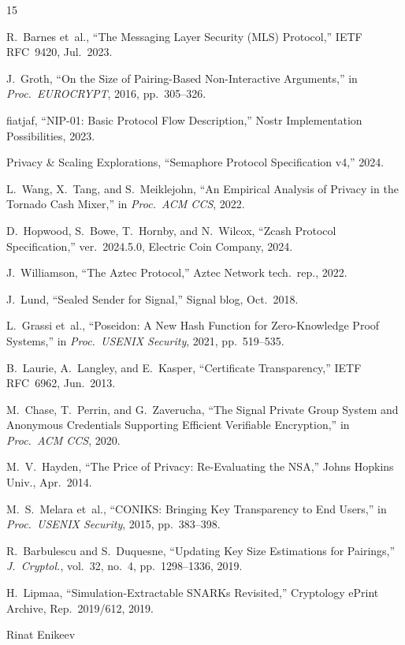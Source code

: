 \documentclass[journal]{IEEEtran}
\begin{document}
\begin{thebibliography}{15}

R.~Barnes et~al., ``The Messaging Layer Security (MLS) Protocol,'' IETF RFC~9420, Jul.\ 2023.

J.~Groth, ``On the Size of Pairing-Based Non-Interactive Arguments,'' in \emph{Proc.\ EUROCRYPT}, 2016, pp.~305--326.

fiatjaf, ``NIP-01: Basic Protocol Flow Description,'' Nostr Implementation Possibilities, 2023.

Privacy \& Scaling Explorations, ``Semaphore Protocol Specification v4,'' 2024.

L.~Wang, X.~Tang, and S.~Meiklejohn, ``An Empirical Analysis of Privacy in the Tornado Cash Mixer,'' in \emph{Proc.\ ACM CCS}, 2022.

D.~Hopwood, S.~Bowe, T.~Hornby, and N.~Wilcox, ``Zcash Protocol Specification,'' ver.\ 2024.5.0, Electric Coin Company, 2024.

J.~Williamson, ``The Aztec Protocol,'' Aztec Network tech.\ rep., 2022.

J.~Lund, ``Sealed Sender for Signal,'' Signal blog, Oct.\ 2018.

L.~Grassi et~al., ``Poseidon: A New Hash Function for Zero-Knowledge Proof Systems,'' in \emph{Proc.\ USENIX Security}, 2021, pp.~519--535.

B.~Laurie, A.~Langley, and E.~Kasper, ``Certificate Transparency,'' IETF RFC~6962, Jun.\ 2013.

M.~Chase, T.~Perrin, and G.~Zaverucha, ``The Signal Private Group System and Anonymous Credentials Supporting Efficient Verifiable Encryption,'' in \emph{Proc.\ ACM CCS}, 2020.

M.~V.~Hayden, ``The Price of Privacy: Re-Evaluating the NSA,'' Johns Hopkins Univ., Apr.\ 2014.

M.~S.~Melara et~al., ``CONIKS: Bringing Key Transparency to End Users,'' in \emph{Proc.\ USENIX Security}, 2015, pp.~383--398.

R.~Barbulescu and S.~Duquesne, ``Updating Key Size Estimations for Pairings,'' \emph{J.\ Cryptol.}, vol.~32, no.~4, pp.~1298--1336, 2019.

H.~Lipmaa, ``Simulation-Extractable SNARKs Revisited,'' Cryptology ePrint Archive, Rep.\ 2019/612, 2019.

\end{thebibliography}

\begin{IEEEbiography}[]{Rinat Enikeev}
\end{IEEEbiography}
\end{document}
